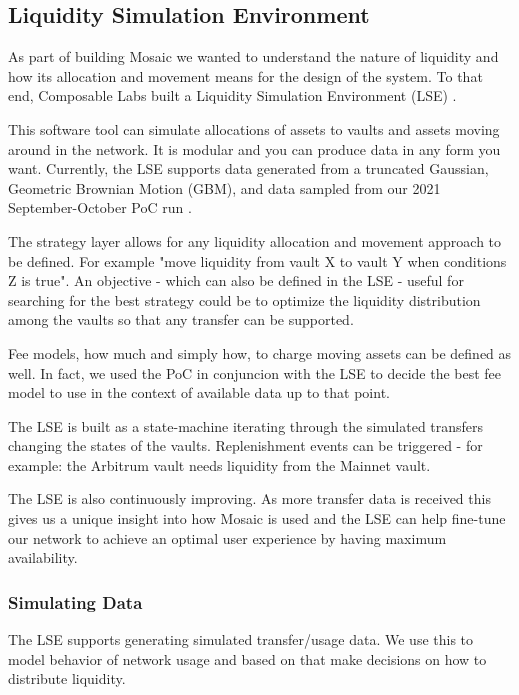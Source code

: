 \subsection{Liquidity Simulation Environment\label{section:lse}}

As part of building Mosaic \cite{MosaicFinance} we wanted to understand the nature of liquidity and how its allocation and movement means for the design of the system.
%
To that end, Composable Labs \cite{IntroducingMedium} built a Liquidity Simulation Environment (LSE) \cite{IntroducingMediumb}.

This software tool can simulate allocations of assets to vaults and assets moving around in the network.
%
It is modular and you can produce data in any form you want.
%
Currently, the LSE supports data generated from a truncated Gaussian, Geometric Brownian Motion (GBM), and data sampled from our 2021 September-October PoC run \cite{TestingMedium}.

The strategy layer allows for any liquidity allocation and movement approach to be defined. For example "move liquidity from vault X to vault Y when conditions Z is true".
%
An objective - which can also be defined in the LSE - useful for searching for the best strategy could be to optimize the liquidity distribution among the vaults so that any transfer can be supported.

Fee models, how much and simply how, to charge moving assets can be defined as well. In fact, we used the PoC in conjuncion with the LSE to decide the best fee model to use in the context of available data up to that point.

The LSE is built as a state-machine iterating through the simulated transfers changing the states of the vaults. Replenishment events can be triggered - for example: the Arbitrum vault needs liquidity from the Mainnet vault.

The LSE is also continuously improving. As more transfer data is received this gives us a unique insight into how Mosaic is used and the LSE can help fine-tune our network to achieve an optimal user experience by having maximum availability.

\subsubsection{Simulating Data}

The LSE supports generating simulated transfer/usage data. We use this to model behavior of network usage and based on that make decisions on how to distribute liquidity.

